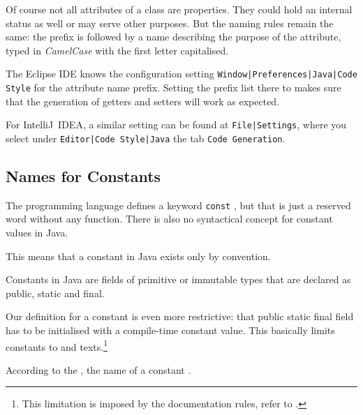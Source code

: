 Of course not all attributes of a class are properties. They could hold an internal status as well or may serve other purposes. But the naming rules remain the same:  the prefix  is followed by a name describing the purpose of the attribute, typed in \textit{CamelCase} with the first letter capitalised.

The Eclipse IDE knows the configuration setting \texttt{Window|Preferences|Java|Code Style} for the attribute name prefix. Setting the prefix list there to  makes sure that the generation of getters and setters will work as expected.

For IntelliJ~IDEA, a similar setting can be found at \texttt{File|Settings}, where you select under \texttt{Editor|Code Style|Java} the tab \texttt{Code Generation}.


\subsection{Names for Constants}\label{sec:Constants}
The \Java programming language defines a keyword \lstinline|const| \autocite{ORACLE_DOC_LANGUAGE_SPECIFICATION:Keywords}, but that is just a reserved word without any function. There is also no syntactical concept for constant values in Java.

This means that a constant in Java exists only by convention. 

Constants in Java are fields of primitive or immutable types that are declared as public, static and final.

Our definition for a constant is even more restrictive: that public static final field has to be initialised with a compile-time constant value. This basically limits constants to  and texts.\footnote{This limitation is imposed by the documentation rules, refer to .}

According to the \ccjpl, the name of a constant  \autocite{SUN_CODE_CONVENTIONS:NamingConventions}.

